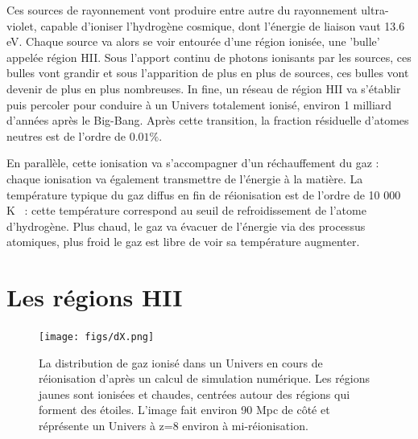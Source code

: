 Ces sources de rayonnement vont produire entre autre du rayonnement ultra-violet, capable d'ioniser l'hydrogène cosmique, dont l'énergie de liaison vaut 13.6 eV. Chaque source va alors se voir entourée d'une région ionisée, une 'bulle' appelée région HII. Sous l'apport continu de photons ionisants par les sources, ces bulles vont grandir et sous l'apparition de plus en plus de sources, ces bulles vont devenir de plus en plus nombreuses. In fine, un réseau de région HII va s'établir puis percoler pour conduire à un Univers totalement ionisé, environ 1 milliard d'années après le Big-Bang. Après cette transition, la fraction résiduelle d'atomes neutres est de l'ordre de $0.01\%$.

En parallèle, cette ionisation va s'accompagner d'un réchauffement du gaz : chaque ionisation va également transmettre de l'énergie à la matière. La température typique du gaz diffus en fin de réionisation est de l'ordre de 10 000 K ~: cette température correspond au seuil de refroidissement de l'atome d'hydrogène. Plus chaud, le gaz va évacuer de l'énergie via des processus atomiques, plus froid le gaz est libre de voir sa température augmenter.

\section{Les régions HII}

\begin{figure}[htbp]
	\centering
		\texttt{[image: figs/dX.png]}
		\caption[Le réseau de bulles ionisées de la réionisation]{La distribution de gaz ionisé dans un Univers en cours de réionisation d'après un calcul de simulation numérique. Les régions jaunes sont ionisées et chaudes, centrées autour des régions qui forment des étoiles. L'image fait environ 90 Mpc de côté et réprésente un Univers à z=8 environ à mi-réionisation.}
	\label{f:dX}
\end{figure} 

